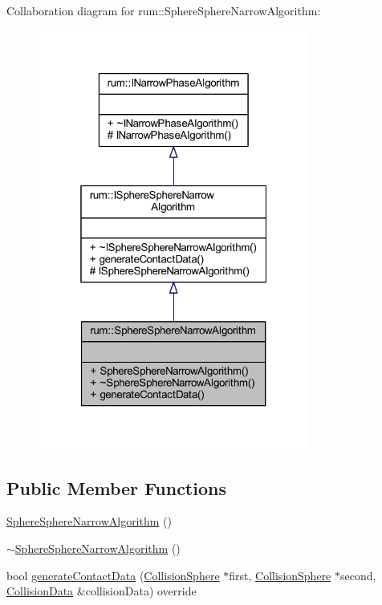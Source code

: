 Collaboration diagram for rum\+:\+:Sphere\+Sphere\+Narrow\+Algorithm\+:\nopagebreak
\begin{figure}[H]
\begin{center}
\leavevmode
\includegraphics[width=253pt]{classrum_1_1_sphere_sphere_narrow_algorithm__coll__graph}
\end{center}
\end{figure}
\subsection*{Public Member Functions}
\begin{DoxyCompactItemize}
\item 
\mbox{\hyperlink{classrum_1_1_sphere_sphere_narrow_algorithm_a3d357c77afc11d7957c9354d100de1ed}{Sphere\+Sphere\+Narrow\+Algorithm}} ()
\item 
\mbox{\hyperlink{classrum_1_1_sphere_sphere_narrow_algorithm_aad843986e10ab391a136204e83168607}{$\sim$\+Sphere\+Sphere\+Narrow\+Algorithm}} ()
\item 
bool \mbox{\hyperlink{classrum_1_1_sphere_sphere_narrow_algorithm_a218ae392c2dde145a4c1fdd3c687f912}{generate\+Contact\+Data}} (\mbox{\hyperlink{classrum_1_1_collision_sphere}{Collision\+Sphere}} $\ast$first, \mbox{\hyperlink{classrum_1_1_collision_sphere}{Collision\+Sphere}} $\ast$second, \mbox{\hyperlink{classrum_1_1_collision_data}{Collision\+Data}} \&collision\+Data) override
\end{DoxyCompactItemize}
